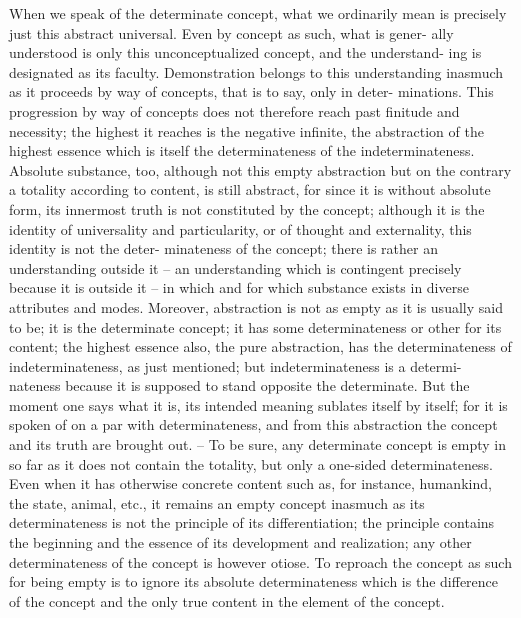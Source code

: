 When we speak of the determinate concept, what we ordinarily mean is
precisely just this abstract universal. Even by concept as such, what is gener-
ally understood is only this unconceptualized concept, and the understand-
ing is designated as its faculty. Demonstration belongs to this understanding
inasmuch as it proceeds by way of concepts, that is to say, only in deter-
minations. This progression by way of concepts does not therefore reach
past finitude and necessity; the highest it reaches is the negative infinite,
the abstraction of the highest essence which is itself the determinateness
of the indeterminateness. Absolute substance, too, although not this empty
abstraction but on the contrary a totality according to content, is still
abstract, for since it is without absolute form, its innermost truth is not
constituted by the concept; although it is the identity of universality and
particularity, or of thought and externality, this identity is not the deter-
minateness of the concept; there is rather an understanding outside it – an
understanding which is contingent precisely because it is outside it – in
which and for which substance exists in diverse attributes and modes.
Moreover, abstraction is not as empty as it is usually said to be; it is the
determinate concept; it has some determinateness or other for its content;
the highest essence also, the pure abstraction, has the determinateness of
indeterminateness, as just mentioned; but indeterminateness is a determi-
nateness because it is supposed to stand opposite the determinate. But the
moment one says what it is, its intended meaning sublates itself by itself;
for it is spoken of on a par with determinateness, and from this abstraction
the concept and its truth are brought out. – To be sure, any determinate
concept is empty in so far as it does not contain the totality, but only a
one-sided determinateness. Even when it has otherwise concrete content
such as, for instance, humankind, the state, animal, etc., it remains an
empty concept inasmuch as its determinateness is not the principle of its
differentiation; the principle contains the beginning and the essence of its
development and realization; any other determinateness of the concept is
however otiose. To reproach the concept as such for being empty is to
ignore its absolute determinateness which is the difference of the concept
and the only true content in the element of the concept.

